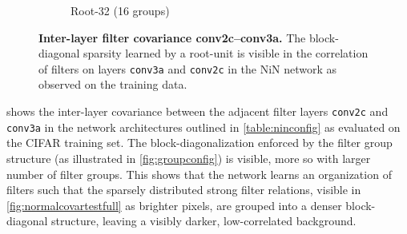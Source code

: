 \documentclass[thesis]{subfiles}
\begin{document}
\begin{figure}[p]
\begin{subfigure}[b]{0.3\textheight}
				\caption{Root-32 (16 groups)}\label{fig:root32corrfull}
			\end{subfigure}
			\caption[Inter-layer filter covariance conv2c--conv3a]{\textbf{Inter-layer filter covariance conv2c--conv3a.} The block-diagonal sparsity learned by a root-unit is visible in the correlation of filters on layers \texttt{conv3a} and \texttt{conv2c} in the NiN network as observed on the  training data.}\label{fig:covar}
		\end{figure}
	
	 shows the inter-layer covariance between the adjacent filter layers \texttt{conv2c} and \texttt{conv3a} in the network architectures outlined in \cref{table:ninconfig} as evaluated on the CIFAR training set. The block-diagonalization enforced by the filter group structure (as illustrated in \cref{fig:groupconfig}) is visible, more so with larger number of filter groups. This shows that the network learns an organization of filters such that the sparsely distributed strong filter relations, visible in \cref{fig:normalcovartestfull} as brighter pixels, are grouped into a denser block-diagonal structure, leaving a visibly darker, low-correlated background.
	
\end{document}
